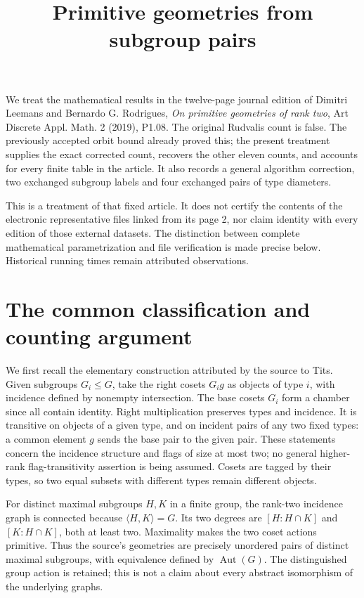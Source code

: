 \documentclass[11pt]{article}
\title{Primitive geometries from subgroup pairs}
\author{}\date{}
\newcommand{\Aut}{\operatorname{Aut}}
\begin{document}
\maketitle
We treat the mathematical results in the twelve-page journal edition of
Dimitri Leemans and Bernardo G. Rodrigues, \emph{On primitive geometries
of rank two}, Art Discrete Appl. Math. 2 (2019), P1.08. The original
Rudvalis count is false. The previously accepted orbit bound already
proved this; the present treatment supplies the exact corrected count,
recovers the other eleven counts, and accounts for every finite table in
the article. It also records a general algorithm correction, two exchanged
subgroup labels and four exchanged pairs of type diameters.

This is a treatment of that fixed article. It does not certify the contents
of the electronic representative files linked from its page 2, nor claim
identity with every edition of those external datasets. The distinction
between complete mathematical parametrization and file verification is
made precise below. Historical running times remain attributed observations.

\section{The common classification and counting argument}
We first recall the elementary construction attributed by the source to
Tits. Given subgroups $G_i\leq G$, take the right cosets $G_i g$ as objects
of type $i$, with incidence defined by nonempty intersection. The base
cosets $G_i$ form a chamber since all contain identity. Right multiplication
preserves types and incidence. It is transitive on objects of a given type,
and on incident pairs of any two fixed types: a common element $g$ sends
the base pair to the given pair. These statements concern the incidence
structure and flags of size at most two; no general higher-rank
flag-transitivity assertion is being assumed.
Cosets are tagged by their types, so two equal subsets with different
types remain different objects.

For distinct maximal subgroups $H,K$ in a finite group, the rank-two
incidence graph is connected because $\langle H,K\rangle=G$. Its two
degrees are $[H:H\cap K]$ and $[K:H\cap K]$, both at least two. Maximality
makes the two coset actions primitive. Thus the source's geometries are
precisely unordered pairs of distinct maximal subgroups, with equivalence
defined by $\Aut(G)$. The distinguished group action is retained; this is
not a claim about every abstract isomorphism of the underlying graphs.
\end{document}
